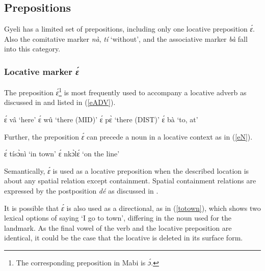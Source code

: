 \subsection{Prepositions} 
\label{sec:PREP}

Gyeli has a limited set of prepositions, including only one locative preposition {\itshape ɛ́}. Also the comitative marker {\itshape nà}, {\itshape tí} `without', and the associative marker {\itshape bà} fall into this category.


\subsubsection{Locative marker {\itshape ɛ́}}
\label{sec:LOCe}

The preposition {\itshape ɛ́}\footnote{The corresponding preposition in Mabi is {\itshape ɔ́}.} is most frequently used to accompany a locative adverb as discussed in  and listed in (\ref{eADV}).

\begin{exe}
\ex\label{eADV}
\begin{xlist}
\ex ɛ́ vâ `here'
\ex ɛ́ wû `there (MID)'
\ex ɛ́ pɛ̀ `there (DIST)'
\ex ɛ́ bà `to, at'
\end{xlist}
\end{exe}

\noindent Further, the preposition {\itshape ɛ́} can precede a noun in a locative context as in (\ref{eN}).

\begin{exe}
\ex\label{eN}
\begin{xlist}
\ex ɛ́ tísɔ̀nì `in town'
\ex ɛ́ nkɔ̀lɛ́ `on the line'
\end{xlist}
\end{exe}

Semantically, {\itshape ɛ́} is used as a locative preposition when the described location is about any spatial relation except containment. Spatial containment relations are expressed by the postposition {\itshape dé} as discussed in .

It is possible that {\itshape ɛ́} is also used as a directional, as in (\ref{totown}), which shows two lexical options of saying `I go to town', differing in the noun used for the landmark. As the final vowel of the verb and the locative preposition are identical, it could be the case that the locative is deleted in its surface form.

